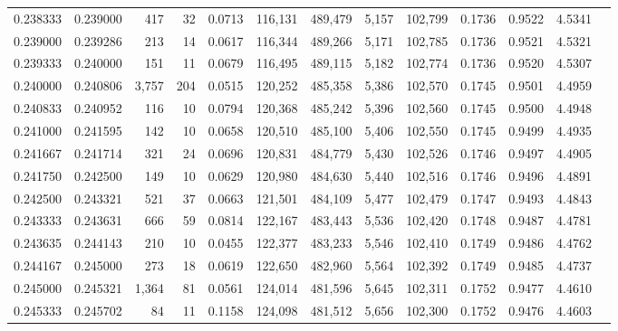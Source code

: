 \begin{tabular}{rrrrrrrrrrrrr}
0.238333 & 0.239000 &   417 &  32 &                                     0.0713 & 116,131 & 489,479 &   5,157 & 102,799 & 0.1736 & 0.9522 & 4.5341 \\
0.239000 & 0.239286 &   213 &  14 &                                     0.0617 & 116,344 & 489,266 &   5,171 & 102,785 & 0.1736 & 0.9521 & 4.5321 \\
0.239333 & 0.240000 &   151 &  11 &                                     0.0679 & 116,495 & 489,115 &   5,182 & 102,774 & 0.1736 & 0.9520 & 4.5307 \\
0.240000 & 0.240806 & 3,757 & 204 &                                     0.0515 & 120,252 & 485,358 &   5,386 & 102,570 & 0.1745 & 0.9501 & 4.4959 \\
0.240833 & 0.240952 &   116 &  10 &                                     0.0794 & 120,368 & 485,242 &   5,396 & 102,560 & 0.1745 & 0.9500 & 4.4948 \\
0.241000 & 0.241595 &   142 &  10 &                                     0.0658 & 120,510 & 485,100 &   5,406 & 102,550 & 0.1745 & 0.9499 & 4.4935 \\
0.241667 & 0.241714 &   321 &  24 &                                     0.0696 & 120,831 & 484,779 &   5,430 & 102,526 & 0.1746 & 0.9497 & 4.4905 \\
0.241750 & 0.242500 &   149 &  10 &                                     0.0629 & 120,980 & 484,630 &   5,440 & 102,516 & 0.1746 & 0.9496 & 4.4891 \\
0.242500 & 0.243321 &   521 &  37 &                                     0.0663 & 121,501 & 484,109 &   5,477 & 102,479 & 0.1747 & 0.9493 & 4.4843 \\
0.243333 & 0.243631 &   666 &  59 &                                     0.0814 & 122,167 & 483,443 &   5,536 & 102,420 & 0.1748 & 0.9487 & 4.4781 \\
0.243635 & 0.244143 &   210 &  10 &                                     0.0455 & 122,377 & 483,233 &   5,546 & 102,410 & 0.1749 & 0.9486 & 4.4762 \\
0.244167 & 0.245000 &   273 &  18 &                                     0.0619 & 122,650 & 482,960 &   5,564 & 102,392 & 0.1749 & 0.9485 & 4.4737 \\
0.245000 & 0.245321 & 1,364 &  81 &                                     0.0561 & 124,014 & 481,596 &   5,645 & 102,311 & 0.1752 & 0.9477 & 4.4610 \\
0.245333 & 0.245702 &    84 &  11 &                                     0.1158 & 124,098 & 481,512 &   5,656 & 102,300 & 0.1752 & 0.9476 & 4.4603 \\

\end{tabular}

